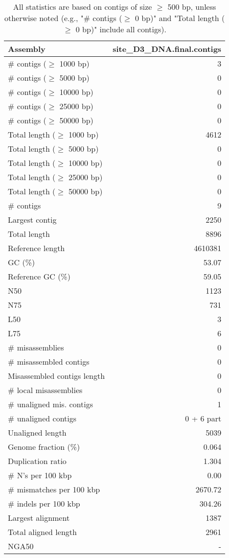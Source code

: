 \documentclass[12pt,a4paper]{article}
\begin{document}
\begin{table}[ht]
\begin{center}
\caption{All statistics are based on contigs of size $\geq$ 500 bp, unless otherwise noted (e.g., "\# contigs ($\geq$ 0 bp)" and "Total length ($\geq$ 0 bp)" include all contigs).}
\begin{tabular}{|l*{1}{|r}|}
\hline
Assembly & site\_D3\_DNA.final.contigs \\ \hline
\# contigs ($\geq$ 1000 bp) & 3 \\ \hline
\# contigs ($\geq$ 5000 bp) & 0 \\ \hline
\# contigs ($\geq$ 10000 bp) & 0 \\ \hline
\# contigs ($\geq$ 25000 bp) & 0 \\ \hline
\# contigs ($\geq$ 50000 bp) & 0 \\ \hline
Total length ($\geq$ 1000 bp) & 4612 \\ \hline
Total length ($\geq$ 5000 bp) & 0 \\ \hline
Total length ($\geq$ 10000 bp) & 0 \\ \hline
Total length ($\geq$ 25000 bp) & 0 \\ \hline
Total length ($\geq$ 50000 bp) & 0 \\ \hline
\# contigs & 9 \\ \hline
Largest contig & 2250 \\ \hline
Total length & 8896 \\ \hline
Reference length & 4610381 \\ \hline
GC (\%) & 53.07 \\ \hline
Reference GC (\%) & 59.05 \\ \hline
N50 & 1123 \\ \hline
N75 & 731 \\ \hline
L50 & 3 \\ \hline
L75 & 6 \\ \hline
\# misassemblies & 0 \\ \hline
\# misassembled contigs & 0 \\ \hline
Misassembled contigs length & 0 \\ \hline
\# local misassemblies & 0 \\ \hline
\# unaligned mis. contigs & 1 \\ \hline
\# unaligned contigs & 0 + 6 part \\ \hline
Unaligned length & 5039 \\ \hline
Genome fraction (\%) & 0.064 \\ \hline
Duplication ratio & 1.304 \\ \hline
\# N's per 100 kbp & 0.00 \\ \hline
\# mismatches per 100 kbp & 2670.72 \\ \hline
\# indels per 100 kbp & 304.26 \\ \hline
Largest alignment & 1387 \\ \hline
Total aligned length & 2961 \\ \hline
NGA50 & - \\ \hline
\end{tabular}
\end{center}
\end{table}
\end{document}
